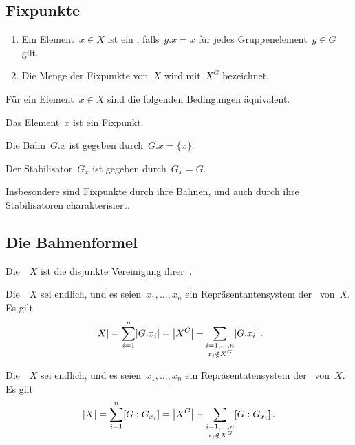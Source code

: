 \subsection{Fixpunkte}

\begin{definition}
  \leavevmode
  \begin{enumerate}
    \item
      Ein Element~$x \in X$ ist ein , falls~$g.x = x$ für jedes Gruppenelement~$g \in G$ gilt.
    \item  
      Die Menge der Fixpunkte von~$X$ wird mit~$X^G$ bezeichnet.
  \end{enumerate}
\end{definition}

\begin{proposition}
  Für ein Element~$x \in X$ sind die folgenden Bedingungen äquivalent.
  \begin{equivlist}
    \item
      Das Element~$x$ ist ein Fixpunkt.
    \item
      Die Bahn~$G.x$ ist gegeben durch~$G.x = \{ x \}$.
    \item
      Der Stabilisator~$G_x$ ist gegeben durch~$G_x = G$.
  \end{equivlist}
  Insbesondere sind Fixpunkte durch ihre Bahnen, und auch durch ihre Stabilisatoren charakterisiert.
\end{proposition}



\subsection{Die Bahnenformel}

\begin{proposition}
  Die~~$X$ ist die disjunkte Vereinigung ihrer~.
\end{proposition}

\begin{corollary}
  Die~~$X$ sei endlich, und es seien~$x_1, \dotsc, x_n$ ein Repräsentantensystem der~ von~$X$.
  Es gilt
  \[
    \card{X}
    =
    \sum_{i=1}^n \card{G.x_i}
    =
    \card*{X^G}
    +
    \sum_{\substack{i=1, \dotsc, n \\ x_i \notin X^G}}
    \card{G.x_i} \,.
  \]
\end{corollary}

\begin{theorem}[Bahnenformel]
  Die~~$X$ sei endlich, und es seien~$x_1, \dotsc, x_n$ ein Repräsentatensystem der~ von~$X$.
  Es gilt
  \[
    \card{X}
    =
    \sum_{i=1}^n [G : G_{x_i}]
    =
    \card*{X^G}
    +
    \sum_{\substack{i=1, \dotsc, n \\ x_i \notin X^G}}
    [G : G_{x_i}] \,.
  \]
\end{theorem}



